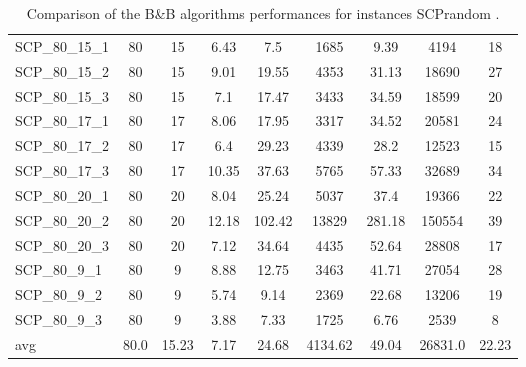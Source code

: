 \begin{table}[!ht]
{\begin{tabular}{lcccccccc}
SCP\_80\_15\_1 & 80 & 15 &  \textcolor{blue2}{6.43} & 7.5 & 1685 & 9.39 & 4194 & 18 \\
SCP\_80\_15\_2 & 80 & 15 &  \textcolor{blue2}{9.01} & 19.55 & 4353 & 31.13 & 18690 & 27 \\
SCP\_80\_15\_3 & 80 & 15 &  \textcolor{blue2}{7.1} & 17.47 & 3433 & 34.59 & 18599 & 20 \\
SCP\_80\_17\_1 & 80 & 17 &  \textcolor{blue2}{8.06} & 17.95 & 3317 & 34.52 & 20581 & 24 \\
SCP\_80\_17\_2 & 80 & 17 &  \textcolor{blue2}{6.4} & 29.23 & 4339 & 28.2 & 12523 & 15 \\
SCP\_80\_17\_3 & 80 & 17 &  \textcolor{blue2}{10.35} & 37.63 & 5765 & 57.33 & 32689 & 34 \\
SCP\_80\_20\_1 & 80 & 20 &  \textcolor{blue2}{8.04} & 25.24 & 5037 & 37.4 & 19366 & 22 \\
SCP\_80\_20\_2 & 80 & 20 &  \textcolor{blue2}{12.18} & 102.42 & 13829 & 281.18 & 150554 & 39 \\
SCP\_80\_20\_3 & 80 & 20 &  \textcolor{blue2}{7.12} & 34.64 & 4435 & 52.64 & 28808 & 17 \\
SCP\_80\_9\_1 & 80 & 9 &  \textcolor{blue2}{8.88} & 12.75 & 3463 & 41.71 & 27054 & 28 \\
SCP\_80\_9\_2 & 80 & 9 &  \textcolor{blue2}{5.74} & 9.14 & 2369 & 22.68 & 13206 & 19 \\
SCP\_80\_9\_3 & 80 & 9 &  \textcolor{blue2}{3.88} & 7.33 & 1725 & 6.76 & 2539 & 8 \\
\cline{1-9} avg & 80.0 & 15.23 & 7.17 & 24.68& 4134.62 & 49.04& 26831.0 & 22.23\\ \cline{1-9}
\bottomrule
\end{tabular}
}%
\caption{Comparison of the B\&B algorithms performances for instances SCPrandom .}
\label{tab:table_EPSILONvsBBvsEPBBB_SCPrandom }
\end{table}
